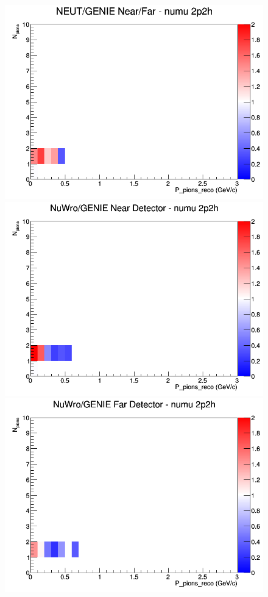 \documentclass[12pt]{article}
\begin{document}
\begin{figure}[h]
\endminipage
{}
\includegraphics[width=\linewidth]{eff_N_P/GAr/pions/ratios/2p2h_NEUT_GENIE_numu_NF_N_P.png}
\endminipage
\newline
{}
\includegraphics[width=\linewidth]{eff_N_P/GAr/pions/ratios/2p2h_NuWro_GENIE_numu_near_N_P.png}
\endminipage
{}
\includegraphics[width=\linewidth]{eff_N_P/GAr/pions/ratios/2p2h_NuWro_GENIE_numu_far_N_P.png}

\end{figure}
\end{document}
